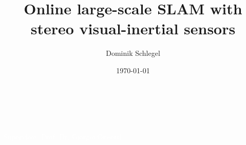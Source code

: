 \documentclass[11pt]{beamer}
\title{Online large-scale SLAM with stereo visual-inertial sensors}
\author{Dominik Schlegel}
\date{\today}
\begin{document}
{
\begin{frame}
\vspace{-70pt}
\center{\Huge{\textcolor{white}{\inserttitle}}}\\
\vspace{20pt}
\begin{minipage}{1.07\textwidth}
\textcolor{white}{\hfill\small{\insertauthor}}\\
\textcolor{white}{\hfill\small{Supervisor: Prof. Dr. Giorgio Grisetti}}
\end{minipage}
\vspace{10pt}\\
\hspace{-25pt}\textcolor{white}{\small{\insertdate}}
\end{frame}
}

\setcounter{framenumber}{0}
\end{document}
